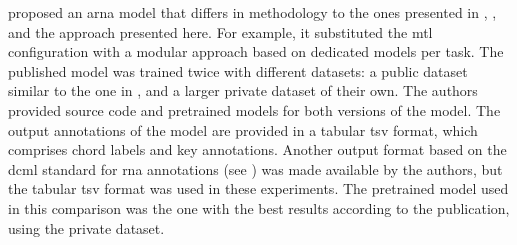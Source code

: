 
\textcite{mcleod2021modular} proposed an \gls{arna} model
that differs in methodology to the ones presented in
\textcite{chen2021attend}, \textcite{micchi2021deep}, and
the approach presented here. For example, it substituted the
\gls{mtl} configuration with a modular approach based on
dedicated models per task. The published model was trained
twice with different datasets: a public dataset similar to
the one in \textcite{micchi2021deep}, and a larger private
dataset of their own. The authors provided source code and
pretrained models for both versions of the model. The output
annotations of the model are provided in a tabular \gls{tsv}
format, which comprises chord labels and key annotations.
Another output format based on the \gls{dcml} standard for
\gls{rna} annotations (see )
was made available by the authors, but the tabular \gls{tsv}
format was used in these experiments. The pretrained model
used in this comparison was the one with the best results
according to the publication, using the private dataset.

